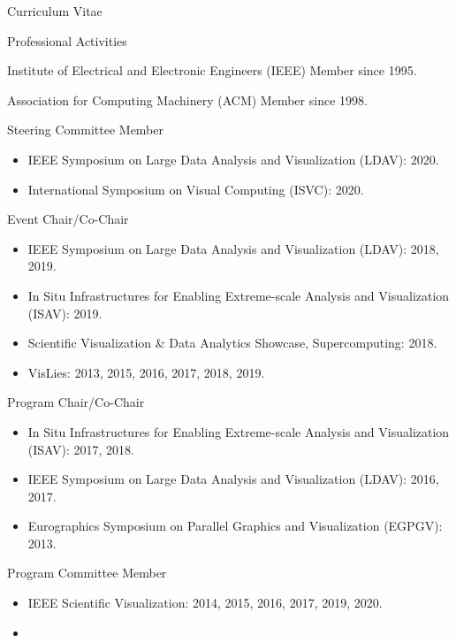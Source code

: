 \documentclass{article}
\begin{document}
\begin{cv}{Curriculum Vitae}
    \begin{cvlist}{Professional Activities}
    \item[Institute of Electrical and Electronic Engineers (IEEE)]
      Member since 1995.
    \item[Association for Computing Machinery (ACM)]  Member since 1998.
    \item[Steering Committee Member]~\\
      \begin{itemize}
      \item
        IEEE Symposium on Large Data Analysis and Visualization (LDAV): 2020.
      \item
        International Symposium on Visual Computing (ISVC): 2020.
      \end{itemize}
    \item[Event Chair/Co-Chair]~\\
      \begin{itemize}
      \item
        IEEE Symposium on Large Data Analysis and Visualization (LDAV): 2018, 2019.
      \item
        In Situ Infrastructures for Enabling Extreme-scale Analysis and Visualization (ISAV): 2019.
      \item
        Scientific Visualization \& Data Analytics Showcase, Supercomputing: 2018.
      \item
        VisLies: 2013, 2015, 2016, 2017, 2018, 2019.
      \end{itemize}
    \item[Program Chair/Co-Chair]~\\
      \begin{itemize}
      \item
        In Situ Infrastructures for Enabling Extreme-scale Analysis and Visualization (ISAV): 2017, 2018.
      \item
        IEEE Symposium on Large Data Analysis and Visualization (LDAV): 2016, 2017.
      \item
        Eurographics Symposium on Parallel Graphics and Visualization (EGPGV): 2013.
      \end{itemize}
    \item[Program Committee Member]~\\
      \begin{itemize}
      \item
        IEEE Scientific Visualization: 2014, 2015, 2016, 2017, 2019, 2020.
      \item

\end{itemize}
\end{cvlist}
\end{cv}
\end{document}
